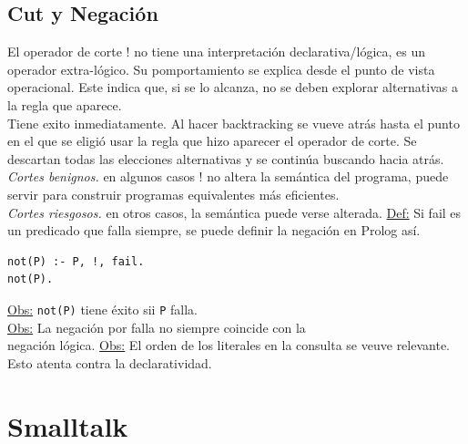 \documentclass[12pt]{extarticle}
\def\definicion{\newline\underline{Def:} }
\def\observacion{\underline{Obs:} }
\begin{document}
\subsection{Cut y Negación}
El operador de corte ! no tiene una interpretación declarativa/lógica, es un operador extra-lógico. Su pomportamiento se explica desde el punto de vista operacional. Este indica que, si se lo alcanza, no se deben explorar alternativas a la regla que aparece. \\
Tiene exito inmediatamente. Al hacer backtracking se vueve atrás hasta el punto en el que se eligió usar la regla que hizo aparecer el operador de corte. Se descartan todas las elecciones alternativas y se continúa buscando hacia atrás. \\
\textit{Cortes benignos.} en algunos casos ! no altera la semántica del programa, puede servir para construir programas equivalentes más eficientes. \\ 
\textit{Cortes riesgosos.} en otros casos, la semántica puede verse alterada.
\definicion Si fail es un predicado que falla siempre, se puede definir la negación en Prolog así.
\begin{verbatim}
not(P) :- P, !, fail.
not(P).
\end{verbatim}
\observacion \verb|not(P)| tiene éxito sii \verb|P| falla. \\
\observacion La negación por falla no siempre coincide con la \\ negación lógica.
\observacion El orden de los literales en la consulta se veuve relevante. Esto atenta contra la declaratividad.

\section{Smalltalk}
\end{document}
